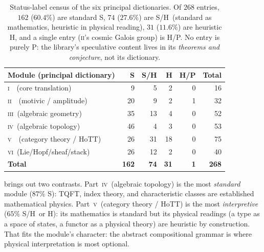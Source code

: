 \documentclass[12pt]{article}
\theoremstyle{definition}
\theoremstyle{remark}
\newcommand{\Sstat}{\textsf{S}}
\newcommand{\Hstat}{\textsf{H}}
\newcommand{\Pstat}{\textsf{P}}
\newcommand{\PI}{\textsc{i}}
\newcommand{\PII}{\textsc{ii}}
\newcommand{\PIII}{\textsc{iii}}
\newcommand{\PIV}{\textsc{iv}}
\newcommand{\PV}{\textsc{v}}
\newcommand{\PVI}{\textsc{vi}}
\begin{document}
\begin{table}[t]
\centering
\renewcommand{\arraystretch}{1.25}
\begin{tabular}{@{}lrrrrr@{}}
\toprule
Module (principal dictionary) & \Sstat & \Sstat/\Hstat & \Hstat & \Hstat/\Pstat & Total \\
\midrule
\PI\ \ (core translation)        & 9  & 5  & 2  & 0 & 16 \\
\PII\ \ (motivic / amplitude)    & 20 & 9  & 2  & 1 & 32 \\
\PIII\ (algebraic geometry)      & 35 & 13 & 4  & 0 & 52 \\
\PIV\ (algebraic topology)       & 46 & 4  & 3  & 0 & 53 \\
\PV\ \ (category theory / HoTT)  & 26 & 31 & 18 & 0 & 75 \\
\PVI\ (Lie/Hopf/sheaf/stack)     & 26 & 12 & 2  & 0 & 40 \\
\midrule
\textbf{Total}                   & \textbf{162} & \textbf{74} & \textbf{31} & \textbf{1} & \textbf{268} \\
\bottomrule
\end{tabular}
\caption{Status-label census of the six principal dictionaries.  Of $268$ entries,
$162$ ($60.4\%$) are standard \Sstat, $74$ ($27.6\%$) are \Sstat/\Hstat\ (standard as
mathematics, heuristic in physical reading), $31$ ($11.6\%$) are heuristic \Hstat, and a
single entry (\PII's cosmic Galois group) is \Hstat/\Pstat.  No entry is purely
\Pstat: the library's speculative content lives in its \emph{theorems and conjecture},
not its dictionary.}
\label{tab:census}
\end{table}

 brings out two contrasts.  Part~\PIV\ (algebraic topology)
is the most \emph{standard} module ($87\%$ \Sstat): TQFT, index theory, and
characteristic classes are established mathematical physics.  Part~\PV\ (category
theory / HoTT) is the most \emph{interpretive} ($65\%$ \Sstat/\Hstat\ or \Hstat): its
mathematics is standard but its physical readings (a type as a space of states, a
functor as a physical theory) are heuristic by construction.  That fits the module's
character: the abstract compositional grammar is where physical interpretation is most
optional.
\end{document}
